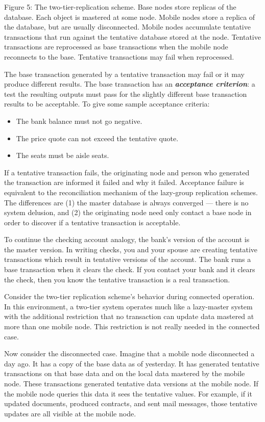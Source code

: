 \documentclass[a4paper,11pt,twoside,openright]{article}
\begin{document}
Figure 5: The two-tier-replication scheme. Base nodes store replicas of
the database. Each object is mastered at some node. Mobile nodes store a
replica of the database, but are usually disconnected. Mobile nodes
accumulate tentative transactions that run against the tentative
database stored at the node. Tentative transactions are reprocessed as
base transactions when the mobile node reconnects to the base. Tentative
transactions may fail when reprocessed.

The base transaction generated by a tentative transaction may fail or it
may produce different results. The base transaction has an
\emph{\textbf{acceptance criterion}}: a test the resulting outputs must
pass for the slightly different base transaction results to be
acceptable. To give some sample acceptance criteria:

\begin{itemize}
\item
  The bank balance must not go negative.
\item
  The price quote can not exceed the tentative quote.
\item
  The seats must be aisle seats.
\end{itemize}

If a tentative transaction fails, the originating node and person who
generated the transaction are informed it failed and why it failed.
Acceptance failure is equivalent to the reconciliation mechanism of the
lazy-group replication schemes. The differences are (1) the master
database is always converged --- there is no system delusion, and (2)
the originating node need only contact a base node in order to discover
if a tentative transaction is acceptable.

To continue the checking account analogy, the bank's version of the
account is the master version. In writing checks, you and your spouse
are creating tentative transactions which result in tentative versions
of the account. The bank runs a base transaction when it clears the
check. If you contact your bank and it clears the check, then you know
the tentative transaction is a real transaction.

Consider the two-tier replication scheme's behavior during connected
operation. In this environment, a two-tier system operates much like a
lazy-master system with the additional restriction that no transaction
can update data mastered at more than one mobile node. This restriction
is not really needed in the connected case.

Now consider the disconnected case. Imagine that a mobile node
disconnected a day ago. It has a copy of the base data as of yesterday.
It has generated tentative transactions on that base data and on the
local data mastered by the mobile node. These transactions generated
tentative data versions at the mobile node. If the mobile node queries
this data it sees the tentative values. For example, if it updated
documents, produced contracts, and sent mail messages, those tentative
updates are all visible at the mobile node.
\end{document}
